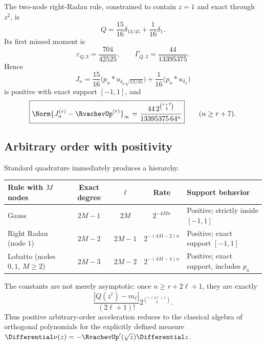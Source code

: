 \documentclass[11pt,oneside]{article}
\numberwithin{equation}{section}
\theoremstyle{definition}
\theoremstyle{remark}
\begin{document}
\begin{example}
\label{p3:ex:radau-two}
The two-node right-Radau rule, constrained to contain $z=1$ and exact through $z^2$,
is
\begin{equation}
 Q=\frac{15}{16}\delta_{13/45}+\frac1{16}\delta_1.
 \label{p3:eq:radau-Q}
\end{equation}
Its first missed moment is
\begin{equation}
 \varepsilon_{Q,3}=\frac{704}{42525},
 \qquad
 \Gamma_{Q,3}=\frac{44}{13395375}.
 \label{p3:eq:radau-gamma}
\end{equation}
Hence
\begin{equation}
 J_n=\frac{15}{16}\bigl(p_n*u_{\delta_n\sqrt{13/45}}\bigr)
 +\frac1{16}\bigl(p_n*u_{\delta_n}\bigr)
 \label{p3:eq:Jn}
\end{equation}
is positive with exact support $[-1,1]$, and
\begin{equation}
 \boxed{
 \Norm{J_n^{(r)}-\RvachevUp^{(r)}}_\infty
 =\frac{44\,2^{\binom{r+7}{2}}}{13395375\,64^n}}
 \qquad(n\ge r+7).
 \label{p3:eq:Radau-two-law}
\end{equation}
\end{example}

\subsection{Arbitrary order with positivity}

Standard quadrature immediately produces a hierarchy.

\begin{center}
\begin{tabularx}{0.96\textwidth}{@{}lcccX@{}}
\toprule
Rule with $M$ nodes & Exact degree & $\ell$ & Rate & Support behavior\\
\midrule
Gauss & $2M-1$ & $2M$ & $2^{-4Mn}$ & Positive; strictly inside $[-1,1]$\\
Right Radau (node $1$) & $2M-2$ & $2M-1$ & $2^{-(4M-2)n}$ & Positive; exact support $[-1,1]$\\
Lobatto (nodes $0,1$, $M\ge2$) & $2M-3$ & $2M-2$ & $2^{-(4M-4)n}$ & Positive; exact support, includes $p_n$\\
\bottomrule
\end{tabularx}
\end{center}

The constants are not merely asymptotic: once $n\ge r+2\ell+1$, they are exactly
\begin{equation}
 \frac{|Q(z^\ell)-m_\ell|}{(2\ell+1)!}
 2^{\binom{r+2\ell+1}{2}}.
 \label{p3:eq:general-quadrature-constant}
\end{equation}
Thus positive arbitrary-order acceleration reduces to the classical algebra of
orthogonal polynomials for the explicitly defined measure
$\Differential\nu(z)=-\RvachevUp'(\sqrt z)\Differential z$.
\end{document}
